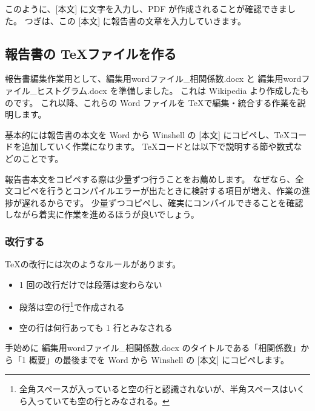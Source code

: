 \noindent
このように、[本文] に文字を入力し、PDF が作成されることが確認できました。
つぎは、この [本文] に報告書の文章を入力していきます。




\subsection{報告書の \TeX ファイルを作る}
報告書編集作業用として、{\gt\ttfamily 編集用wordファイル\_相関係数.docx} と {\gt\ttfamily 編集用wordファイル\_ヒストグラム.docx} を準備しました。
これは Wikipedia より作成したものです。
これ以降、これらの Word ファイルを \TeX で編集・統合する作業を説明します。

基本的には報告書の本文を Word から Winshell の [本文] にコピペし、\TeX コードを追加していく作業になります。
\TeX コードとは以下で説明する節や数式などのことです。

報告書本文をコピペする際は少量ずつ行うことをお薦めします。
なぜなら、全文コピペを行うとコンパイルエラーが出たときに検討する項目が増え、作業の進捗が遅れるからです。
少量ずつコピペし、確実にコンパイルできることを確認しながら着実に作業を進めるほうが良いでしょう。




\subsubsection{改行する}
\TeX の改行には次のようなルールがあります。
	\begin{itemize}
	\item 1 回の改行だけでは段落は変わらない
	\item 段落は空の行\footnote{全角スペースが入っていると空の行と認識されないが、半角スペースはいくら入っていても空の行とみなされる。}で作成される
	\item 空の行は何行あっても 1 行とみなされる
	\end{itemize}

手始めに {\gt\ttfamily 編集用wordファイル\_相関係数.docx} のタイトルである「相関係数」から「1 概要」の最後までを Word から Winshell の [本文] にコピペします。


